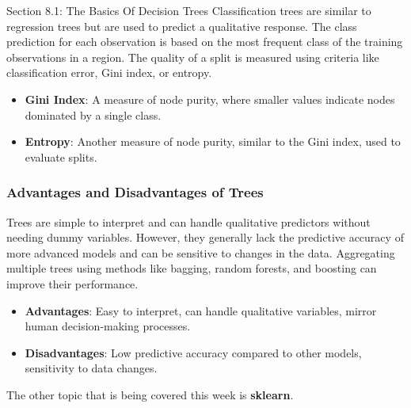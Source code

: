 \begin{notes}{Section 8.1: The Basics Of Decision Trees}
    Classification trees are similar to regression trees but are used to predict a qualitative response. The class prediction for each observation is based on the most frequent class of the training 
    observations in a region. The quality of a split is measured using criteria like classification error, Gini index, or entropy.
    
    \begin{highlight}
        \begin{itemize}
            \item \textbf{Gini Index}: A measure of node purity, where smaller values indicate nodes dominated by a single class.
            \item \textbf{Entropy}: Another measure of node purity, similar to the Gini index, used to evaluate splits.
        \end{itemize}
    \end{highlight}
    
    \subsubsection*{Advantages and Disadvantages of Trees}
    
    Trees are simple to interpret and can handle qualitative predictors without needing dummy variables. However, they generally lack the predictive accuracy of more advanced models and can be sensitive 
    to changes in the data. Aggregating multiple trees using methods like bagging, random forests, and boosting can improve their performance.
    
    \begin{highlight}
        \begin{itemize}
            \item \textbf{Advantages}: Easy to interpret, can handle qualitative variables, mirror human decision-making processes.
            \item \textbf{Disadvantages}: Low predictive accuracy compared to other models, sensitivity to data changes.
        \end{itemize}
    \end{highlight}
\end{notes}

The other topic that is being covered this week is \textbf{sklearn}.

